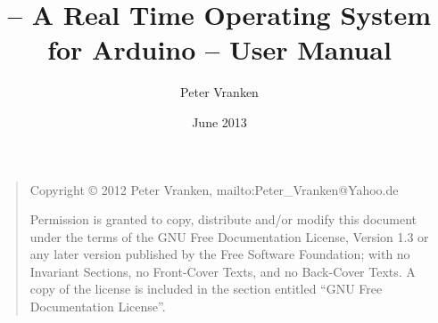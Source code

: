 \documentclass[10pt,twoside,a4paper,openany]{report}
\title{\rtos \linebreak -- A Real Time Operating System for Arduino -- \linebreak User Manual}
\author{Peter Vranken}
\date{June 2013}
\begin{document}
\maketitle

\bigskip
\begin{quote}
    Copyright \copyright{} 2012  Peter Vranken, mailto:Peter\_Vranken@Yahoo.de
    
    Permission is granted to copy, distribute and/or modify this document
    under the terms of the GNU Free Documentation License, Version 1.3
    or any later version published by the Free Software Foundation;
    with no Invariant Sections, no Front-Cover Texts, and no Back-Cover Texts.
    A copy of the license is included in the section entitled ``GNU
    Free Documentation License''.
\end{quote}
\bigskip


\tableofcontents {}






\end{document}

